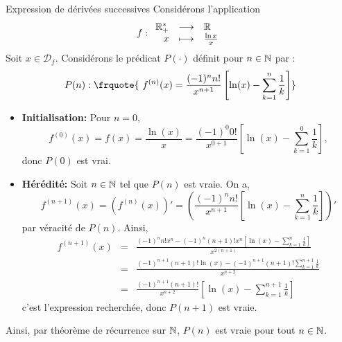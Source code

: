 \documentclass{article}
\begin{document}
\begin{question_kholle}
	{Expression de dérivées successives}
	Considérons l’application
	\[
		f:\begin{array}{rcl}
			\mathbb R_+^* & \longrightarrow & \mathbb R              \\
			x      & \longmapsto     & \frac{\ln x}{x}
		\end{array}\]
	Soit $x\in \mathcal{D}_f$.
	Considérons le prédicat $P(\cdot)$ définit pour $n\in \mathbb N$ par :
	$$ P(n): \frquote{\ f^{(n)}(x) = \frac{(-1)^n n!}{x^{n+1}}\left[ \ln (x) - \sum_{k=1}^n \frac{1}{k} \right]}$$
	\begin{itemize}[label=$\star$]
		\item \textbf{Initialisation: }
		      Pour $n = 0$, $$f^{(0)}(x) = f(x) = \frac{\ln (x)}{x} = \frac{(-1)^0 0!}{x^{0+1}}\left[ \ln (x) - \sum_{k=1}^0 \frac{1}{k} \right],$$ donc $P(0)$ est vrai.
		\item \textbf{Hérédité: }
		      Soit $n\in \mathbb N$ tel que $P(n)$ est vraie. On a,
		      $$f^{(n+1)}(x) = (f^{(n)}(x))' = \left( \frac{(-1)^n n!}{x^{n+1}}\left[ \ln (x) - \sum_{k=1}^n \frac{1}{k} \right] \right)'$$
		      par véracité de $P(n)$. Ainsi,
		      $$\begin{array}{rcl}
				      f^{(n+1)}(x) & = & \frac{(-1)^nn!x^n - (-1)^n(n+1)!x^n\left[ \ln (x) - \sum_{k=1}^n \frac{1}{k} \right]}{x^{2(n+1)}} \\ [1ex]
				                   & = & \frac{(-1)^{n+1}(n+1)!\ln (x) - (-1)^{n+1}(n+1)!\sum_{k=1}^{n+1} \frac{1}{k} }{x^{n+2}}           \\ [1ex]
				                   & = & \frac{(-1)^{n+1} (n+1)!}{x^{n+2}}\left[ \ln (x) - \sum_{k=1}^{n+1} \frac{1}{k} \right]
			      \end{array}$$
		      c'est l'expression recherchée, donc $P(n+1)$ est vraie.
	\end{itemize}
	Ainsi, par théorème de récurrence sur $\mathbb N$, $P(n)$ est vraie pour tout $n\in \mathbb N$.
\end{question_kholle}
\end{document}
